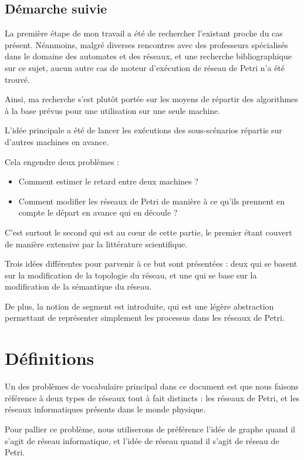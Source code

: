 \subsection{Démarche suivie}
La première étape de mon travail a été de rechercher l'existant proche du cas présent. Néanmoins, malgré diverses rencontres avec des professeurs spécialisés dans le domaine des automates et des réseaux, et une recherche bibliographique sur ce sujet, aucun autre cas de moteur d'exécution de réseau de Petri n'a été trouvé.

Ainsi, ma recherche s'est plutôt portée sur les moyens de répartir des algorithmes à la base prévus pour une utilisation sur une seule machine. 

L'idée principale a été de lancer les exécutions des sous-scénarios répartis sur d'autres machines en avance.

Cela engendre deux problèmes : 
\begin{itemize}
\item Comment estimer le retard entre deux machines ?
\item Comment modifier les réseaux de Petri de manière à ce qu'ils prennent en compte le départ en avance qui en découle ?
\end{itemize}

C'est surtout le second qui est au cœur de cette partie, le premier étant couvert de manière extensive par la littérature scientifique.

Trois idées différentes pour parvenir à ce but sont présentées : deux qui se basent sur la modification de la topologie du réseau, et une qui se base sur la modification de la sémantique du réseau.

De plus, la notion de segment est introduite, qui est une légère abstraction permettant de représenter simplement les processus dans les réseaux de Petri.

\section{Définitions}
Un des problèmes de vocabulaire principal dans ce document est que nous faisons référence à deux types de réseaux tout à fait distincts : les réseaux de Petri, et les réseaux informatiques présents dans le monde physique.

Pour pallier ce problème, nous utiliserons de préférence l'idée de graphe quand il s'agit de réseau informatique, et l'idée de réseau quand il s'agit de réseau de Petri.

